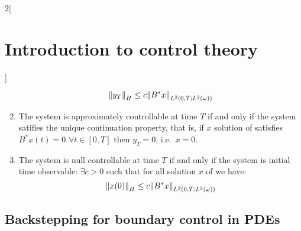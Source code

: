 \documentclass[../../../main_math.tex]{subfiles}
\begin{document}
\begin{multicols}{2}[\section{Introduction to control theory}]
\begin{theorem}
\begin{enumerate}
            $$
              \norm{y_T}_{H}\leq c\norm{B^*x}_{L^2(0,T;L^2(\omega))}
            $$
      \item The system  is approximately controllable at time $T$ if and only if the system  satifies the unique continuation property, that is, if $x$ solution of  satisfies $B^*x(t)=0$ $\forall t\in [0,T]$ then $y_T=0$, i.e.\ $x=0$.
      \item The system  is null controllable at time $T$ if and only if the system  is initial time observable: $\exists c>0$ such that for all solution $x$ of  we have:
            $$
              \norm{x(0)}_{H}\leq c\norm{B^*x}_{L^2(0,T;L^2(\omega))}
            $$
    \end{enumerate}
  \end{theorem}
  \subsection{Backstepping for boundary control in PDEs}
\end{multicols}
\end{document}
